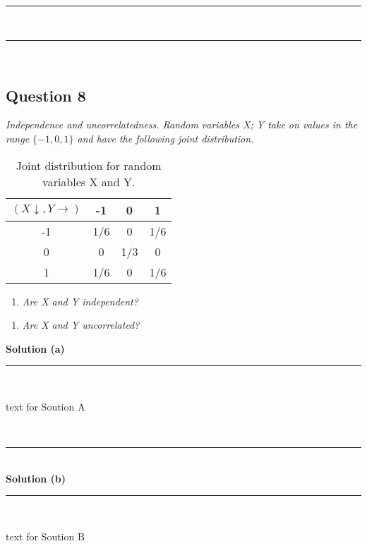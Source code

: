 \documentclass{article}
\begin{document}
\noindent\rule{\textwidth}{0.4pt}\\

\noindent\rule{\textwidth}{0.4pt}\\

\newpage

\subsection*{Question 8}
\textit{Independence and uncorrelatedness. Random variables X; Y take on values in the range $\{-1,0,1\}$ and have the following joint distribution.}\\

\begin{table}[h]
\centering
\begin{tabular}{c|ccc}
$(X\downarrow ,Y \rightarrow)$ & -1 & 0 & 1 \\ \hline
-1 & 1/6 & 0 & 1/6 \\
0 & 0 & 1/3 & 0 \\
1 & 1/6 & 0 & 1/6 \\
\end{tabular}
\caption{Joint distribution for random variables X and Y.}
\label{tab:example_fractions}
\end{table}



\begin{enumerate}[label=(a)]
  \item \textit{Are X and Y independent?}
\end{enumerate}

\begin{enumerate}[label=(b)]
  \item \textit{Are X and Y uncorrelated?}
\end{enumerate}

\textbf{Solution (a)}

\noindent\rule{\textwidth}{0.4pt}\\

\parbox{\textwidth}{text for Soution A}\\

\noindent\rule{\textwidth}{0.4pt}\\

\textbf{Solution (b)}

\noindent\rule{\textwidth}{0.4pt}\\

\parbox{\textwidth}{text for Soution B}\\
\end{document}
